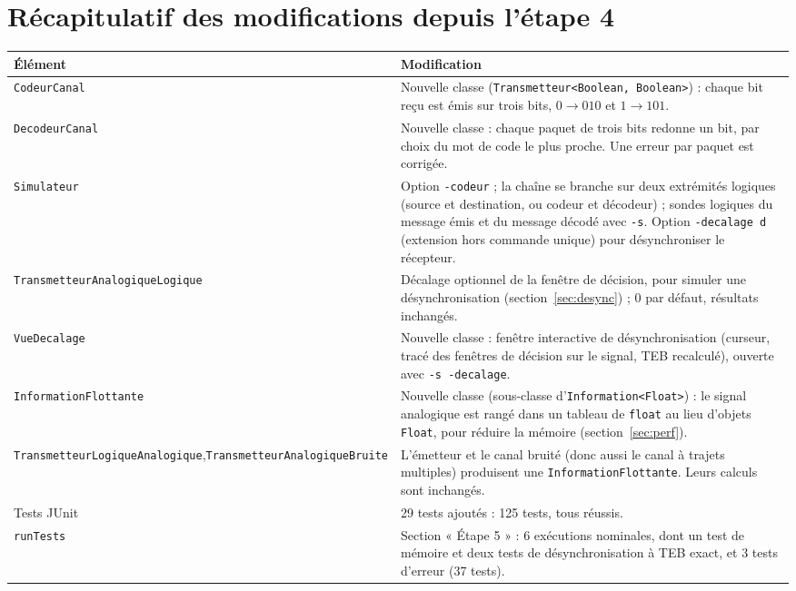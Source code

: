 \documentclass[11pt,a4paper]{article}
\begin{document}
\section{Récapitulatif des modifications depuis l'étape 4}
\begin{center}\small\begin{tabularx}{\linewidth}{>{\raggedright\arraybackslash}p{4.2cm}X}\toprule
Élément & Modification\\\midrule
\texttt{CodeurCanal} & Nouvelle classe (\texttt{Transmetteur<Boolean, Boolean>}) : chaque bit reçu est émis sur trois bits, $0 \to 010$ et $1 \to 101$.\\
\texttt{DecodeurCanal} & Nouvelle classe : chaque paquet de trois bits redonne un bit, par choix du mot de code le plus proche. Une erreur par paquet est corrigée.\\
\texttt{Simulateur} & Option \texttt{-codeur} ; la chaîne se branche sur deux extrémités logiques (source et destination, ou codeur et décodeur) ; sondes logiques du message émis et du message décodé avec \texttt{-s}. Option \texttt{-decalage d} (extension hors commande unique) pour désynchroniser le récepteur.\\
\texttt{TransmetteurAnalogique}\newline\texttt{Logique} & Décalage optionnel de la fenêtre de décision, pour simuler une désynchronisation (section~\ref{sec:desync}) ; 0 par défaut, résultats inchangés.\\
\texttt{VueDecalage} & Nouvelle classe : fenêtre interactive de désynchronisation (curseur, tracé des fenêtres de décision sur le signal, TEB recalculé), ouverte avec \texttt{-s -decalage}.\\
\texttt{InformationFlottante} & Nouvelle classe (sous-classe d'\texttt{Information<Float>}) : le signal analogique est rangé dans un tableau de \texttt{float} au lieu d'objets \texttt{Float}, pour réduire la mémoire (section~\ref{sec:perf}).\\
\texttt{TransmetteurLogique}\newline\texttt{Analogique},\newline\texttt{TransmetteurAnalogique}\newline\texttt{Bruite} & L'émetteur et le canal bruité (donc aussi le canal à trajets multiples) produisent une \texttt{InformationFlottante}. Leurs calculs sont inchangés.\\
Tests JUnit & 29 tests ajoutés : 125 tests, tous réussis.\\
\texttt{runTests} & Section « Étape 5 » : 6 exécutions nominales, dont un test de mémoire et deux tests de désynchronisation à TEB exact, et 3 tests d'erreur (37 tests).\\

\end{tabularx}
\end{center}
\end{document}
